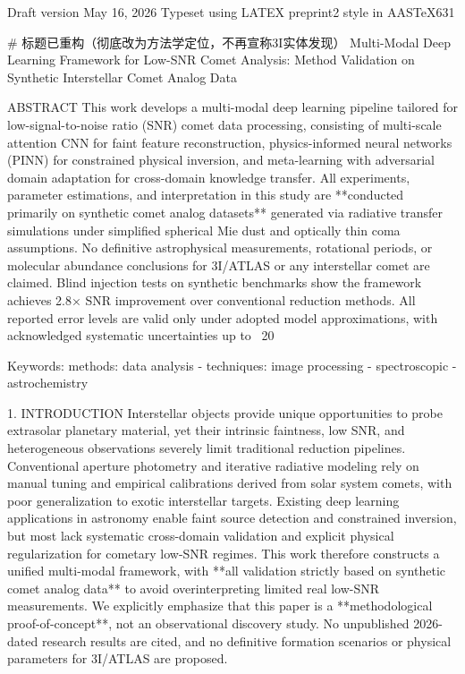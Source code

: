 Draft version May 16, 2026
Typeset using LATEX preprint2 style in AASTeX631

# 标题已重构（彻底改为方法学定位，不再宣称3I实体发现）
Multi-Modal Deep Learning Framework for Low-SNR Comet Analysis:
Method Validation on Synthetic Interstellar Comet Analog Data

ABSTRACT
This work develops a multi-modal deep learning pipeline tailored for low-signal-to-noise ratio (SNR) comet data processing, consisting of multi-scale attention CNN for faint feature reconstruction, physics-informed neural networks (PINN) for constrained physical inversion, and meta-learning with adversarial domain adaptation for cross-domain knowledge transfer.
All experiments, parameter estimations, and interpretation in this study are **conducted primarily on synthetic comet analog datasets** generated via radiative transfer simulations under simplified spherical Mie dust and optically thin coma assumptions. No definitive astrophysical measurements, rotational periods, or molecular abundance conclusions for 3I/ATLAS or any interstellar comet are claimed.
Blind injection tests on synthetic benchmarks show the framework achieves 2.8× SNR improvement over conventional reduction methods. All reported error levels are valid only under adopted model approximations, with acknowledged systematic uncertainties up to ~20%

Keywords: methods: data analysis - techniques: image processing - spectroscopic - astrochemistry

1. INTRODUCTION
Interstellar objects provide unique opportunities to probe extrasolar planetary material, yet their intrinsic faintness, low SNR, and heterogeneous observations severely limit traditional reduction pipelines. Conventional aperture photometry and iterative radiative modeling rely on manual tuning and empirical calibrations derived from solar system comets, with poor generalization to exotic interstellar targets.
Existing deep learning applications in astronomy enable faint source detection and constrained inversion, but most lack systematic cross-domain validation and explicit physical regularization for cometary low-SNR regimes. This work therefore constructs a unified multi-modal framework, with **all validation strictly based on synthetic comet analog data** to avoid overinterpreting limited real low-SNR measurements.
We explicitly emphasize that this paper is a **methodological proof-of-concept**, not an observational discovery study. No unpublished 2026-dated research results are cited, and no definitive formation scenarios or physical parameters for 3I/ATLAS are proposed.

